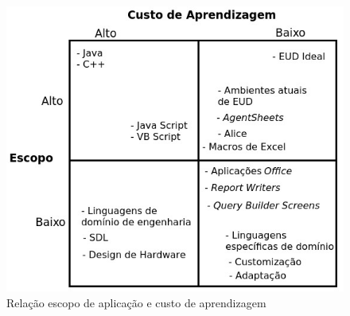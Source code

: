 \begin{figure}[h]
	\centering
	\label{fig01}
		\includegraphics[keepaspectratio=true]{figuras/trade_off_eud_editado}
	\caption{Relação escopo de aplicação e custo de aprendizagem}
\end{figure}

 

